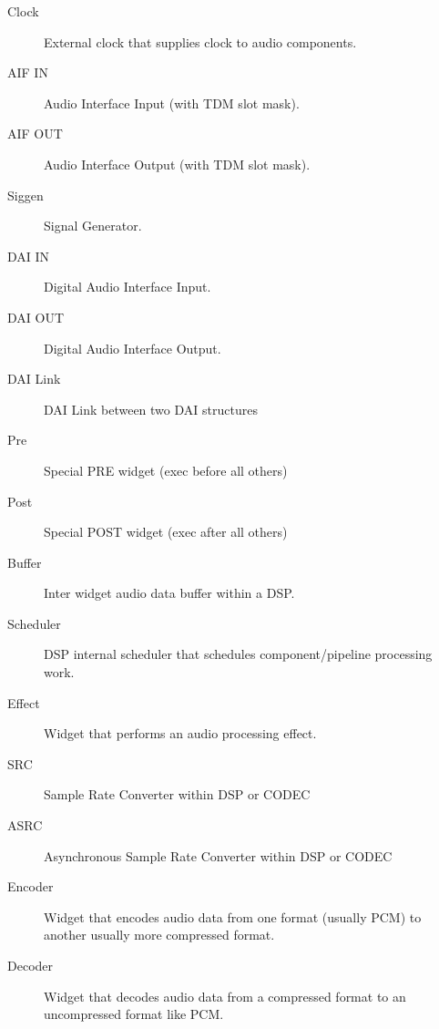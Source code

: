 \documentclass[a4paper,8pt,english]{sphinxmanual}
\begin{document}
\begin{description}
\item[{Clock}] \leavevmode
External clock that supplies clock to audio components.

\item[{AIF IN}] \leavevmode
Audio Interface Input (with TDM slot mask).

\item[{AIF OUT}] \leavevmode
Audio Interface Output (with TDM slot mask).

\item[{Siggen}] \leavevmode
Signal Generator.

\item[{DAI IN}] \leavevmode
Digital Audio Interface Input.

\item[{DAI OUT}] \leavevmode
Digital Audio Interface Output.

\item[{DAI Link}] \leavevmode
DAI Link between two DAI structures

\item[{Pre}] \leavevmode
Special PRE widget (exec before all others)

\item[{Post}] \leavevmode
Special POST widget (exec after all others)

\item[{Buffer}] \leavevmode
Inter widget audio data buffer within a DSP.

\item[{Scheduler}] \leavevmode
DSP internal scheduler that schedules component/pipeline processing
work.

\item[{Effect}] \leavevmode
Widget that performs an audio processing effect.

\item[{SRC}] \leavevmode
Sample Rate Converter within DSP or CODEC

\item[{ASRC}] \leavevmode
Asynchronous Sample Rate Converter within DSP or CODEC

\item[{Encoder}] \leavevmode
Widget that encodes audio data from one format (usually PCM) to another
usually more compressed format.

\item[{Decoder}] \leavevmode
Widget that decodes audio data from a compressed format to an
uncompressed format like PCM.

\end{description}
\end{document}
